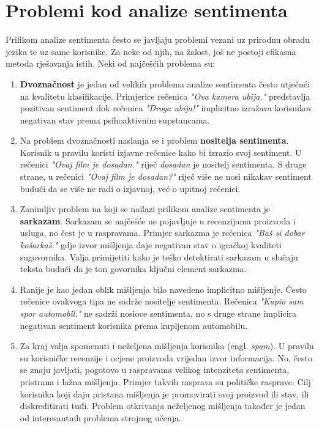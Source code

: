 \documentclass[times, utf8, zavrsni, numeric]{fer}
\begin{document}
\section{Problemi kod analize sentimenta} \label{saprob}
Prilikom analize sentimenta često se javljaju problemi vezani uz prirodnu obradu jezika te uz same korisnike.
Za neke od njih, na žalost, još ne postoji efikasna metoda rješavanja istih.
Neki od najčešćih problema su:

\begin{enumerate}
  \item \textbf{Dvoznačnost} je jedan od velikih problema analize sentimenta često utječući na kvalitetu 
  klasifikacije.
  Primjerice rečenica \textit{"Ova kamera ubija."} predstavlja pozitivan sentiment dok rečenica
  \textit{"Droga ubija!"} implicitno izražava korisnikov negativan stav prema psihoaktivnim supstancama.

  \item Na problem dvoznačnosti naslanja se i problem \textbf{nositelja sentimenta}. Korisnik u pravilu
  koristi izjavne rečenice kako bi izrazio svoj sentiment. U rečenici \textit{"Ovaj film je dosadan."}
  riječ \textit{dosadan} je nositelj sentimenta.
  S druge strane, u rečenici \textit{"Ovaj film je dosadan?"} riječ više ne nosi nikakav sentiment budući
  da se više ne radi o izjavnoj, već o upitnoj rečenici.

  \item Zanimljiv problem na koji se nailazi prilikom analize sentimenta je \textbf{sarkazam}.
  Sarkazam se najčešće ne pojavljuje u recenzijama proizvoda i usluga, no čest je u raspravama.
  Primjer sarkazma je rečenica \textit{"Baš si dobar košarkaš."} gdje izvor mišljenja daje negativan
  stav o igračkoj kvaliteti sugovornika. Valja primijetiti kako je teško detektirati sarkazam u slučaju
  teksta budući da je ton govornika ključni element sarkazma.

  \item Ranije je kao jedan oblik mišljenja bilo navedeno implicitno mišljenje. Često rečenice ovakvoga
  tipa ne sadrže nositelje sentimenta. Rečenica \textit{"Kupio sam spor automobil."} ne sadrži nosioce
  sentimenta, no s druge strane implicira negativan sentiment korisnika prema kupljenom automobilu.

  \item Za kraj valja spomenuti i neželjena mišljenja korisnika (engl. \textit{spam}).
  U pravilu su korisničke recenzije i ocjene proizvoda vrijedan izvor informacija.
  No, često se znaju javljati, pogotovo u raspravama velikog intenziteta sentimenta, pristrana i lažna
  mišljenja.
  Primjer takvih rasprava su političke rasprave.
  Cilj korisnika koji daju pristana mišljenja je promovirati svoj proizvod ili stav, ili diskreditirati
  tuđi.
  Problem otkrivanja neželjenog mišljenja također je jedan od interesantnih problema strojnog učenja.
\end{enumerate}
\end{document}
